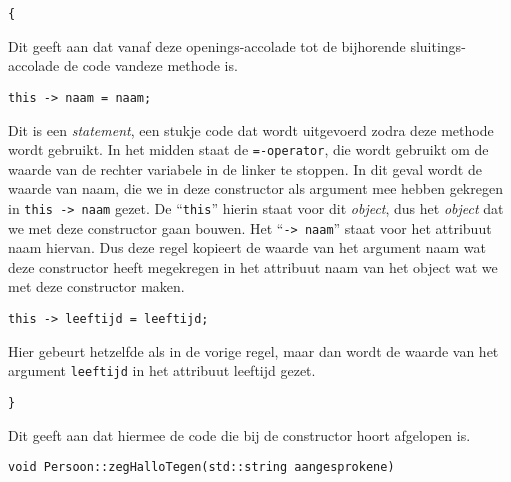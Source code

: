 \documentclass{article}
\begin{document}
\begin{lstlisting}[frame=none]
{
\end{lstlisting}

Dit geeft aan dat vanaf deze openings-accolade tot de bijhorende sluitings-accolade de code vandeze methode is.

\begin{lstlisting}[frame=none]
this -> naam = naam;
\end{lstlisting}

Dit is een \emph{statement}, een stukje code dat wordt uitgevoerd zodra deze methode wordt gebruikt. In het midden staat de \texttt{=-operator}, die wordt gebruikt om de waarde van de rechter variabele in de linker te stoppen. In dit geval wordt de waarde van naam, die we in deze constructor als argument mee hebben gekregen in \texttt{this -> naam} gezet. De “\texttt{this}” hierin staat voor dit \emph{object}, dus het \emph{object} dat we met deze constructor gaan bouwen. Het “\texttt{-> naam}” staat voor het attribuut naam hiervan. Dus deze regel kopieert de waarde van het argument naam wat deze constructor heeft megekregen in het attribuut naam van het object wat we met deze constructor maken.

\begin{lstlisting}[frame=none]
this -> leeftijd = leeftijd;
\end{lstlisting}

Hier gebeurt hetzelfde als in de vorige regel, maar dan wordt de waarde van het argument \texttt{leeftijd} in het attribuut leeftijd gezet.

\begin{lstlisting}[frame=none]
}
\end{lstlisting}

Dit geeft aan dat hiermee de code die bij de constructor hoort afgelopen is.

\begin{lstlisting}[frame=none]
void Persoon::zegHalloTegen(std::string aangesprokene)
\end{lstlisting}
\end{document}
